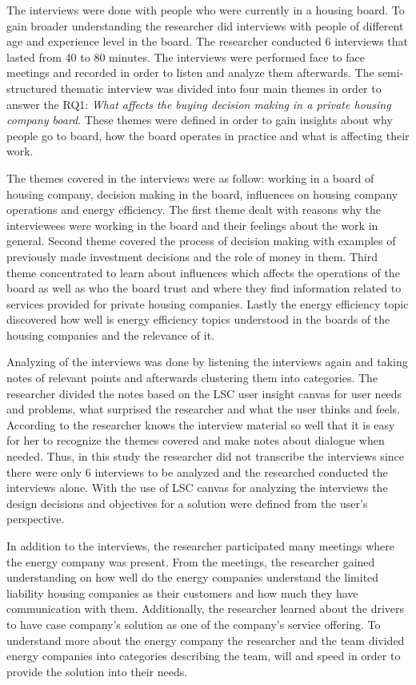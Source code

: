 The interviews were done with people who were currently in a housing board. To gain broader understanding the researcher did interviews with people of different age and experience level in the board. The researcher conducted 6 interviews that lasted from 40 to 80 minutes. The interviews were performed face to face meetings and recorded in order to listen and analyze them afterwards. The semi-structured thematic interview was divided into four main themes in order to answer the RQ1: \emph{What affects the buying decision making in a private housing company board}. These themes were defined in order to gain insights about why people go to board, how the board  operates in practice and what is affecting their work. 

The themes covered in the interviews were as follow: working in a board of housing company, decision making in the board, influences on housing company operations and energy efficiency.  The first theme dealt with reasons why the interviewees were working in the board and their feelings about the work in general.  Second theme covered the process of decision making with examples of previously made investment decisions and the role of money in them.  Third theme concentrated to learn about influences which affects the operations of the board as well as who the board trust and where they find information related to services provided for private housing companies.  Lastly the energy efficiency topic discovered how well is energy efficiency topics understood in the boards of the housing companies and the relevance of it.

Analyzing of the interviews was done by listening the interviews again and taking notes of relevant points and afterwards clustering them into categories. The researcher divided the notes based on the LSC user insight canvas for user needs and problems, what surprised the researcher and what the user thinks and feels. According to \textcite{HH:2001} the researcher knows the interview material so well that it is easy for her to recognize the themes covered and make notes about dialogue when needed. Thus, in this study the researcher did not transcribe the interviews since there were only 6 interviews to be analyzed and the researched conducted the interviews alone. With the use of LSC canvas for analyzing the interviews the design decisions and objectives for a solution were defined from the user's perspective.

In addition to the interviews, the researcher participated many meetings where the energy company was present. From the meetings, the researcher gained understanding on how well do the energy companies understand the limited liability housing companies as their customers and how much they have communication with them. Additionally, the researcher learned about the drivers to have case company's solution as one of the company's service offering. To understand more about the energy company the researcher and the team divided energy companies into categories describing the team, will and speed in order to provide the solution into  their needs.

